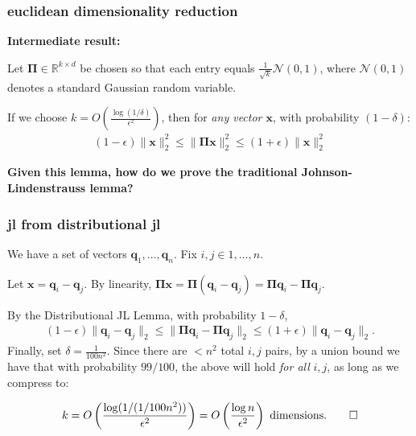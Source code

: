 \documentclass[compress]{beamer}
\newcommand{\bs}[1]{\boldsymbol{#1}}
\newcommand{\bv}[1]{\mathbf{#1}}
\newcommand{\R}{\mathbb{R}}
\begin{document}
\begin{frame}
	\frametitle{euclidean dimensionality reduction}
	\textbf{Intermediate result:}
	\begin{lemma}
		Let $\bs{\Pi} \in \R^{k\times d}$ be chosen so that each entry equals $\frac{1}{\sqrt{k}}  \mathcal{N}(0,1)$, where $\mathcal{N}(0,1)$ denotes a standard Gaussian random variable. 
		
		If we choose $k = O\left(\frac{\log(1/\delta)}{\epsilon^2}\right)$, then for \emph{any vector $\bv{x}$}, with probability $(1-\delta)$:
		\begin{align*}
			(1-\epsilon)\|\bv{x}\|_2^2 \leq \|\bs{\Pi}\bv{x}\|_2^2 \leq (1+\epsilon) \|\bv{x}\|_2^2
		\end{align*}
	\end{lemma}
	
	\begin{center}\alert{
			\textbf{Given this lemma, how do we prove the traditional Johnson-Lindenstrauss lemma?}}
	\end{center}
\end{frame}


\begin{frame}
	\frametitle{jl from distributional jl}
	We have a set of vectors $\bv{q}_1, \ldots, \bv{q}_n$. Fix $i,j \in 1,\ldots, n$. 
	
	Let $\bv{x} = \bv{q}_i - \bv{q}_j$. By linearity, $\bs{\Pi}\bv{x} = \bs{\Pi}(\bv{q}_i - \bv{q}_j) = \bs{\Pi}\bv{q}_i - \bs{\Pi}\bv{q}_j$.
	
	By the Distributional JL Lemma, with probability $1-\delta$,
	\begin{align*}
		(1-\epsilon)\|\bv{q}_i - \bv{q}_j\|_2 \leq \|\bs{\Pi}\bv{q}_i - \bs{\Pi}\bv{q}_j\|_2 \leq (1+\epsilon) \|\bv{q}_i - \bv{q}_j\|_2.
	\end{align*}
	Finally, set $\delta = \frac{1}{100n^2}$. Since there are $< n^2$ total $i,j$ pairs, by a union bound we have that with probability $99/100$, the above will hold \emph{for all} $i,j$, as long as we compress to:
	
	\begin{align*}
		k = O\left(\frac{\log(1/(1/100n^2))}{\epsilon^2}\right) = O\left(\frac{\log n}{\epsilon^2}\right) \text{ dimensions.}\qed
	\end{align*}
	
\end{frame}
\end{document}
